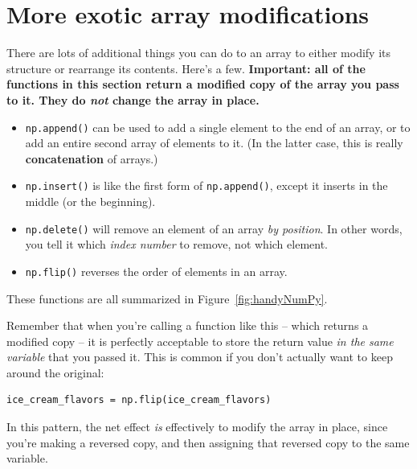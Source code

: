 \section{More exotic array modifications}

There are lots of additional things you can do to an array to either modify its
structure or rearrange its contents. Here's a few. \textbf{Important: all of
the functions in this section return a modified copy of the array you pass to
it. They do \textit{not} change the array in place.}

\begin{itemize}
\itemsep.1em
\item \texttt{np.append()} can be used to add a single element to the end of an
array, or to add an entire second array of elements to it. (In the latter case,
this is really \textbf{concatenation} of arrays.)
\item \texttt{np.insert()} is like the first form of \texttt{np.append()},
except it inserts in the middle (or the beginning).
\item \texttt{np.delete()} will remove an element of an array \textit{by
position}. In other words, you tell it which \textit{index number} to remove,
not which element.
\item \texttt{np.flip()} reverses the order of elements in an array.
\end{itemize}

These functions are all summarized in Figure~\ref{fig:handyNumPy}.

Remember that when you're calling a function like this -- which returns a
modified copy -- it is perfectly acceptable to store the return value
\textit{in the same variable} that you passed it. This is common if you don't
actually want to keep around the original:

\begin{Verbatim}[fontsize=\small,samepage=true,frame=single,framesep=3mm]
ice_cream_flavors = np.flip(ice_cream_flavors)
\end{Verbatim}

In this pattern, the net effect \textit{is} effectively to modify the array in
place, since you're making a reversed copy, and then assigning that reversed
copy to the same variable.

